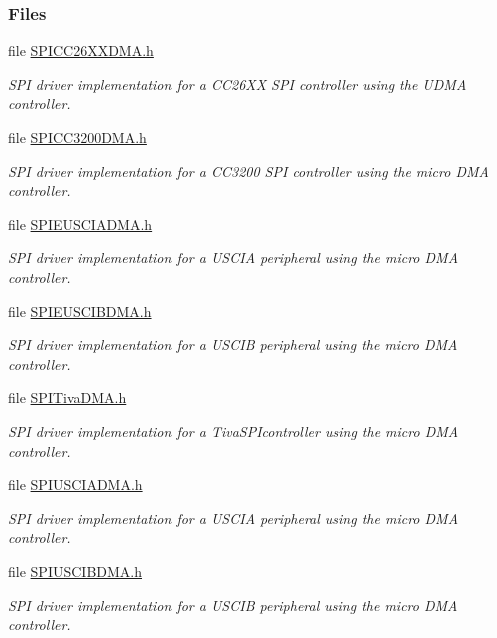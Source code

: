 \subsubsection*{Files}
\begin{DoxyCompactItemize}
\item 
file \hyperlink{_s_p_i_c_c26_x_x_d_m_a_8h}{S\-P\-I\-C\-C26\-X\-X\-D\-M\-A.\-h}
\begin{DoxyCompactList}\small\item\em S\-P\-I driver implementation for a C\-C26\-X\-X S\-P\-I controller using the U\-D\-M\-A controller. \end{DoxyCompactList}\item 
file \hyperlink{_s_p_i_c_c3200_d_m_a_8h}{S\-P\-I\-C\-C3200\-D\-M\-A.\-h}
\begin{DoxyCompactList}\small\item\em S\-P\-I driver implementation for a C\-C3200 S\-P\-I controller using the micro D\-M\-A controller. \end{DoxyCompactList}\item 
file \hyperlink{_s_p_i_e_u_s_c_i_a_d_m_a_8h}{S\-P\-I\-E\-U\-S\-C\-I\-A\-D\-M\-A.\-h}
\begin{DoxyCompactList}\small\item\em S\-P\-I driver implementation for a U\-S\-C\-I\-A peripheral using the micro D\-M\-A controller. \end{DoxyCompactList}\item 
file \hyperlink{_s_p_i_e_u_s_c_i_b_d_m_a_8h}{S\-P\-I\-E\-U\-S\-C\-I\-B\-D\-M\-A.\-h}
\begin{DoxyCompactList}\small\item\em S\-P\-I driver implementation for a U\-S\-C\-I\-B peripheral using the micro D\-M\-A controller. \end{DoxyCompactList}\item 
file \hyperlink{_s_p_i_tiva_d_m_a_8h}{S\-P\-I\-Tiva\-D\-M\-A.\-h}
\begin{DoxyCompactList}\small\item\em S\-P\-I driver implementation for a Tiva\-S\-P\-Icontroller using the micro D\-M\-A controller. \end{DoxyCompactList}\item 
file \hyperlink{_s_p_i_u_s_c_i_a_d_m_a_8h}{S\-P\-I\-U\-S\-C\-I\-A\-D\-M\-A.\-h}
\begin{DoxyCompactList}\small\item\em S\-P\-I driver implementation for a U\-S\-C\-I\-A peripheral using the micro D\-M\-A controller. \end{DoxyCompactList}\item 
file \hyperlink{_s_p_i_u_s_c_i_b_d_m_a_8h}{S\-P\-I\-U\-S\-C\-I\-B\-D\-M\-A.\-h}
\begin{DoxyCompactList}\small\item\em S\-P\-I driver implementation for a U\-S\-C\-I\-B peripheral using the micro D\-M\-A controller. \end{DoxyCompactList}\end{DoxyCompactItemize}
